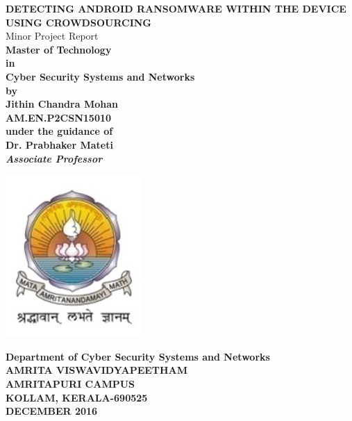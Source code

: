 \documentclass[a4paper,11pt]{report}
\title{}
\author{}
\title{}
\author{}
\date{}
\begin{document}
\begin{titlepage}

\begin{center}


\large \textbf {DETECTING ANDROID RANSOMWARE WITHIN THE DEVICE USING CROWDSOURCING}\\[0.1in]
 { Minor Project Report}\\
  \vspace{0.1cm}
       \large\bf{Master of Technology}\\
       \large\bf{in}\\
        \vspace{.1cm}
       \large\bf{Cyber Security Systems and Networks}\\
        \large\bf{by}\\
       \large\bf{Jithin Chandra Mohan}\\
       \large\bf{AM.EN.P2CSN15010}\\
       \vspace{.1cm}
       {under the guidance of}\\
       \large\bf{Dr. Prabhaker Mateti\\ \textit{Associate Professor}}      
        \vspace{0.1cm}
        \begin{center}
         \includegraphics[scale=0.3]{kkk.jpg}
        \end{center}
        \vspace{0.1cm}
      \large {\bf Department of Cyber Security Systems and Networks\\
      AMRITA VISWAVIDYAPEETHAM\\
          AMRITAPURI CAMPUS\\
      KOLLAM, KERALA-690525\\
      DECEMBER 2016}\\[0.2in]
\vspace{1.1in}

\vfill

\end{center}

\end{titlepage}
\end{document}
